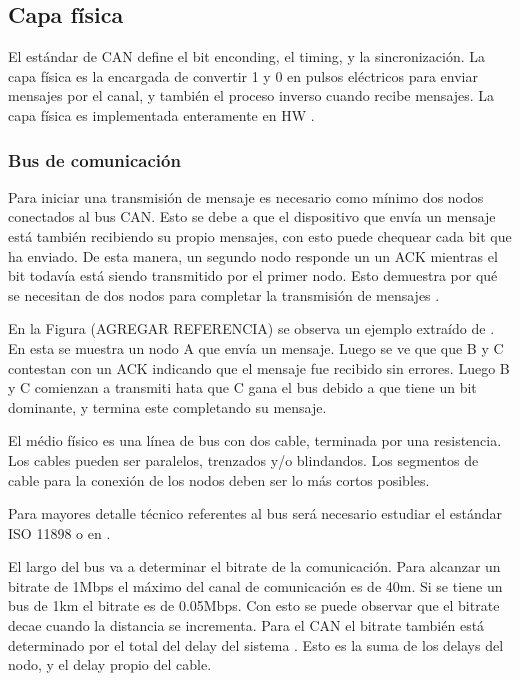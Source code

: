 \subsection{Capa física}
El estándar de CAN define el bit enconding, el timing, y la sincronización. La capa física es la encargada de convertir 1 y 0 en pulsos eléctricos para enviar mensajes por el canal, y también el proceso inverso cuando recibe mensajes. La capa física es implementada enteramente en \ac{HW} \citep{texasFISICACAN}.

\subsubsection{Bus de comunicación}
Para iniciar una transmisión de mensaje es necesario como mínimo dos nodos conectados al bus CAN. Esto se debe a que el dispositivo que envía un mensaje está también recibiendo su propio mensajes, con esto puede chequear cada bit que ha enviado. De esta manera, un segundo nodo responde un un ACK mientras el bit todavía está siendo transmitido por el primer nodo. Esto demuestra por qué se necesitan de dos nodos para completar la transmisión de mensajes \citep{texasFISICACAN}.

En la Figura (AGREGAR REFERENCIA) se observa un ejemplo extraído de \citep{texasFISICACAN}. En esta se muestra un nodo A que envía un mensaje. Luego se ve que que B y C contestan con un ACK indicando que el mensaje fue recibido sin errores. Luego B y C comienzan a transmiti hata que C gana el bus debido a que tiene un bit dominante, y termina este completando su mensaje.


El médio físico  es una línea de bus con dos cable, terminada por una resistencia. Los cables pueden ser paralelos, trenzados y/o blindandos. Los segmentos de cable para la conexión de los nodos deben ser lo más cortos posibles.

Para mayores detalle técnico referentes al bus será necesario estudiar el estándar ISO 11898 o en \cite{texasFISICACAN}.

El largo del bus va a determinar el bitrate de la comunicación. Para alcanzar un bitrate de 1Mbps el máximo del canal de comunicación es de 40m. Si se tiene un bus de 1km el bitrate es de 0.05Mbps. Con esto se puede observar que el bitrate decae cuando la distancia se incrementa. Para el CAN el bitrate también está determinado por el total del delay del sistema \citep{texasFISICACAN}. Esto es la suma de los delays del nodo, y el delay propio del cable.

